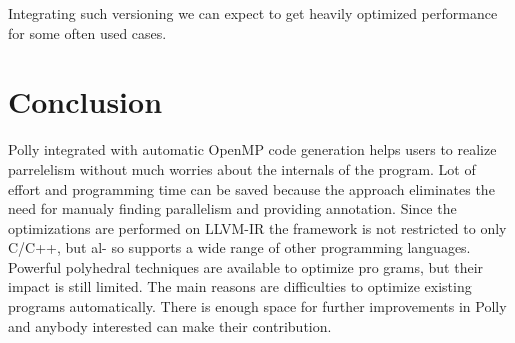Integrating such versioning we can expect to get heavily optimized performance 
for some often used cases.

\section{Conclusion}
Polly integrated with automatic OpenMP code generation helps users to
realize parrelelism without much worries about the internals of the program.
Lot of effort and programming time can be saved because
the approach eliminates the need for manualy finding parallelism and providing annotation.
Since the optimizations are performed on LLVM-IR the framework is not restricted to only C/C++, but al-
so supports a wide range of other programming languages.
Powerful polyhedral techniques are available to optimize pro
grams, but their impact is still limited. The main reasons
are difficulties to optimize existing programs automatically. There is enough space for further improvements in Polly
and anybody interested can make their contribution. 
